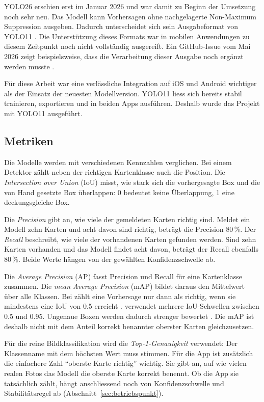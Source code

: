 YOLO26 erschien erst im Januar 2026 und war damit zu Beginn der
Umsetzung noch sehr neu. Das Modell kann Vorhersagen ohne
nachgelagerte Non-Maximum Suppression ausgeben. Dadurch unterscheidet
sich sein Ausgabeformat von YOLO11 \cite{ultralytics2026yolo26}. Die
Unterstützung dieses Formats war in mobilen Anwendungen zu diesem
Zeitpunkt noch nicht vollständig ausgereift. Ein GitHub-Issue vom
Mai 2026 zeigt beispielsweise, dass die Verarbeitung dieser Ausgabe
noch ergänzt werden musste \cite{ultralytics2026flutter487}.

Für diese Arbeit war eine verlässliche Integration auf iOS und Android
wichtiger als der Einsatz der neuesten Modellversion. YOLO11 liess sich
bereits stabil trainieren, exportieren und in beiden Apps ausführen.
Deshalb wurde das Projekt mit YOLO11 ausgeführt.

\subsection{Metriken}\label{sec:metriken}

Die Modelle werden mit verschiedenen Kennzahlen verglichen. Bei einem
Detektor zählt neben der richtigen Kartenklasse auch die Position. Die
\emph{Intersection over Union} (IoU) misst, wie stark sich die
vorhergesagte Box und die von Hand gesetzte Box überlappen: 0 bedeutet
keine Überlappung, 1 eine deckungsgleiche Box.

Die \emph{Precision} gibt an, wie viele der gemeldeten Karten richtig
sind. Meldet ein Modell zehn Karten und acht davon sind richtig, beträgt
die Precision 80\,\%. Der \emph{Recall} beschreibt, wie viele der
vorhandenen Karten gefunden werden. Sind zehn Karten vorhanden und das
Modell findet acht davon, beträgt der Recall ebenfalls 80\,\%. Beide
Werte hängen von der gewählten Konfidenzschwelle ab.

Die \emph{Average Precision} (AP) fasst Precision und Recall für eine
Kartenklasse zusammen. Die \emph{mean Average Precision} (mAP) bildet
daraus den Mittelwert über alle Klassen. Bei  zählt eine
Vorhersage nur dann als richtig, wenn sie mindestens eine IoU von 0.5
erreicht \cite{everingham2010pascal}.  verwendet mehrere
IoU-Schwellen zwischen 0.5 und 0.95. Ungenaue Boxen werden dadurch
strenger bewertet
\cite{lin2014coco,coco2015eval,ultralytics2025metrics}. Die mAP ist
deshalb nicht mit dem Anteil korrekt benannter oberster Karten
gleichzusetzen.

Für die reine Bildklassifikation wird die \emph{Top-1-Genauigkeit}
verwendet: Der Klassenname mit dem höchsten Wert muss stimmen. Für die
App ist zusätzlich die einfachere Zahl \enquote{oberste Karte richtig}
wichtig. Sie gibt an, auf wie vielen realen Fotos das Modell die oberste
Karte korrekt benennt. Ob die App sie tatsächlich zählt, hängt
anschliessend noch von
Konfidenzschwelle und Stabilitätsregel ab
(Abschnitt~\ref{sec:betriebspunkt}).

